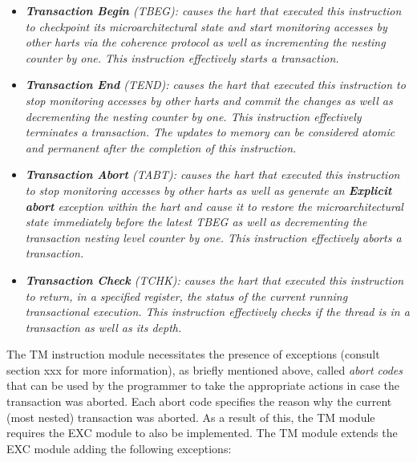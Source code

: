         \begin{itemize}

            \item \textit{\textbf{Transaction Begin} (TBEG): causes the hart that executed this instruction to checkpoint its microarchitectural state and start monitoring accesses by other harts via the coherence protocol as well as incrementing the nesting counter by one. This instruction effectively starts a transaction.}

            \item \textit{\textbf{Transaction End} (TEND): causes the hart that executed this instruction to stop monitoring accesses by other harts and commit the changes as well as decrementing the nesting counter by one. This instruction effectively terminates a transaction. The updates to memory can be considered atomic and permanent after the completion of this instruction.}

            \item \textit{\textbf{Transaction Abort} (TABT): causes the hart that executed this instruction to stop monitoring accesses by other harts as well as generate an \textbf{Explicit abort} exception within the hart and cause it to restore the microarchitectural state immediately before the latest TBEG as well as decrementing the transaction nesting level counter by one. This instruction effectively aborts a transaction.}

            \item \textit{\textbf{Transaction Check} (TCHK): causes the hart that executed this instruction to return, in a specified register, the status of the current running transactional execution. This instruction effectively checks if the thread is in a transaction as well as its depth.}

        \end{itemize}

        The TM instruction module necessitates the presence of exceptions (consult section xxx for more information), as briefly mentioned above, called \textit{abort codes} that can be used by the programmer to take the appropriate actions in case the transaction was aborted. Each abort code specifies the reason why the current (most nested) transaction was aborted. As a result of this, the TM module requires the EXC module to also be implemented. The TM module extends the EXC module adding the following exceptions:

